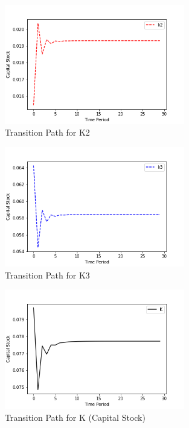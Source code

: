 \documentclass[letterpaper,11pt]{article}
\theoremstyle{definition}
\begin{document}
\begin{spacing}{1.5}
	\begin{Exercise} \label{Linear_HW_OLG}
			\begin{figure}[H]
				\caption{Transition Path for K2}
				\label{fig:k2_tpi}
				\includegraphics[width=0.7\textwidth]{k2TPI.png}
			\end{figure}

			\begin{figure}[H]
				\caption{Transition Path for K3}
				\label{fig:k3_tpi}
				\includegraphics[width=0.7\textwidth]{k3TPI.png}
			\end{figure}

			\begin{figure}[H]
				\caption{Transition Path for K (Capital Stock)}
				\label{fig:K_tpi}
				\includegraphics[width=0.7\textwidth]{KTPI.png}
			\end{figure}


\end{Exercise}
\end{spacing}
\end{document}
